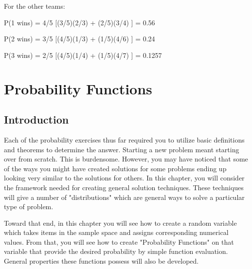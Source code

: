 \documentclass[10pt,]{book}
\theoremstyle{plain}
\theoremstyle{definition}
\theoremstyle{definition}
\theoremstyle{definition}
\numberwithin{equation}{section}
\begin{document}
	For the other teams:
\par

	P(1 wins) = 4/5 [(3/5)(2/3) + (2/5)(3/4) ] = 0.56
\par

	P(2 wins) = 3/5 [(4/5)(1/3) + (1/5)(4/6) ] = 0.24
\par

	P(3 wins) = 2/5 [(4/5)(1/4) + (1/5)(4/7) ] = 0.1257
\typeout{************************************************}
\typeout{************************************************}
\chapter[{Probability Functions}]{Probability Functions}\label{ProbabilityFunctions}
\typeout{************************************************}
\typeout{************************************************}
\section[{Introduction}]{Introduction}\label{section-23}
Each of the probability exercises thus far required you to utilize basic definitions and theorems to determine the answer. Starting a new problem meant starting over from scratch. This is burdensome.  However, you may have noticed that some of the ways you might have created solutions for some problems ending up looking very similar to the solutions for others. In this chapter, you will consider the framework needed for creating general solution techniques. These techniques will give a number of "distributions" which are general ways to solve a particular type of problem.
\par

	Toward that end, in this chapter you will see how to create a random variable which takes items in the sample space and assigns corresponding numerical values. From that, you will see how to create "Probability Functions" on that variable that provide the desired probability by simple function evaluation. General properties these functions possess will also be developed.
\typeout{************************************************}
\typeout{************************************************}
\end{document}
